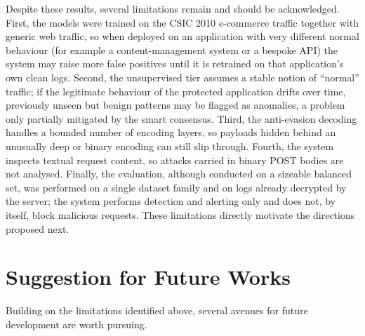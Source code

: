 \documentclass[12pt,a4paper]{report}
\begin{document}
Despite these results, several limitations remain and should be acknowledged.
First, the models were trained on the CSIC 2010 e-commerce traffic together
with generic web traffic, so when deployed on an application with very
different normal behaviour (for example a content-management system or a
bespoke API) the system may raise more false positives until it is retrained
on that application's own clean logs. Second, the unsupervised tier assumes a
stable notion of ``normal'' traffic; if the legitimate behaviour of the
protected application drifts over time, previously unseen but benign patterns
may be flagged as anomalies, a problem only partially mitigated by the smart
consensus. Third, the anti-evasion decoding handles a bounded number of
encoding layers, so payloads hidden behind an unusually deep or binary
encoding can still slip through. Fourth, the system inspects textual request
content, so attacks carried in binary POST bodies are not analysed. Finally,
the evaluation, although conducted on a sizeable balanced set, was performed
on a single dataset family and on logs already decrypted by the server; the
system performs detection and alerting only and does not, by itself, block
malicious requests. These limitations directly motivate the directions
proposed next.

\section{Suggestion for Future Works}
\label{sec:future}

Building on the limitations identified above, several avenues for future
development are worth pursuing.
\end{document}
